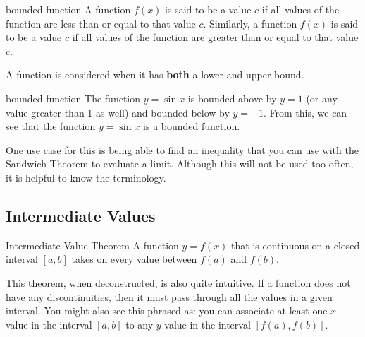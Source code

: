 \begin{definition}{bounded function}
    A function \( f \left( x \right) \) is said to be  a value \( c \) if all values of the function are less than or equal to that value \( c \). Similarly, a function \( f \left( x \right) \) is said to be  a value \( c \) if all values of the function are greater than or equal to that value \( c \).
    
    \vspace{0.2cm}
    
    A function is considered  when it has \textbf{both} a lower and upper bound.
\end{definition}

\begin{example}{bounded function}
    The function \( y = \sin{x} \) is bounded above by \( y = 1 \) (or any value greater than \( 1 \) as well) and bounded below by \( y = -1 \). From this, we can see that the function \( y = \sin{x} \) is a bounded function.
\end{example}

One use case for this is being able to find an inequality that you can use with the Sandwich Theorem to evaluate a limit. Although this will not be used too often, it is helpful to know the terminology. 

\subsection{Intermediate Values}

\begin{theorem}{Intermediate Value Theorem}
    A function \( y = f \left( x \right) \) that is continuous on a closed interval \( [a, b] \) takes on every value between \( f \left( a \right) \) and \( f \left( b \right) \).
\end{theorem}

This theorem, when deconstructed, is also quite intuitive. If a function does not have any discontinuities, then it must pass through all the values in a given interval. You might also see this phrased as: you can associate at least one \( x \) value in the interval \( [a, b] \) to any \( y \) value in the interval \( [f \left( a \right), f \left( b \right)] \).

